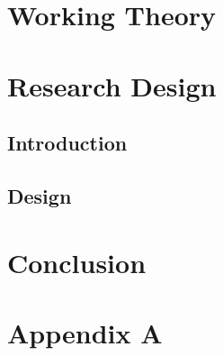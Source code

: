 \documentclass{ifacconf}
\begin{document}
	\section{Working Theory}
	
	\section{Research Design}
	\subsection{Introduction}
	\subsection{Design}
	
	\section{Conclusion}
	
	
	
	\printglossary[title={Abbreviations}]
	
	\appendix
	\section{Appendix A}
\end{document}
